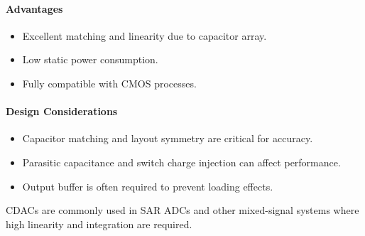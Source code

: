 \paragraph{Advantages}
\begin{itemize}
    \item Excellent matching and linearity due to capacitor array.
    \item Low static power consumption.
    \item Fully compatible with CMOS processes.
\end{itemize}

\paragraph{Design Considerations}
\begin{itemize}
    \item Capacitor matching and layout symmetry are critical for accuracy.
    \item Parasitic capacitance and switch charge injection can affect performance.
    \item Output buffer is often required to prevent loading effects.
\end{itemize}

CDACs are commonly used in SAR ADCs and other mixed-signal systems where high linearity and integration are required.



